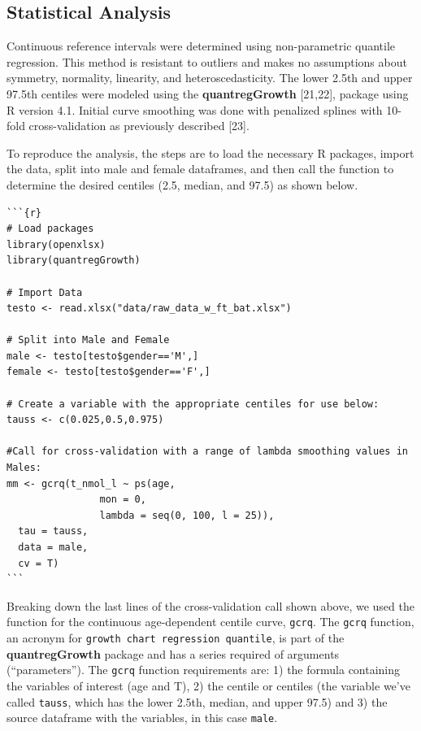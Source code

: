 \documentclass[]{elsarticle} %
\begin{document}
\hypertarget{statistical-analysis}{%
\subsection{Statistical Analysis}\label{statistical-analysis}}

Continuous reference intervals were determined using non-parametric
quantile regression. This method is resistant to outliers and makes no
assumptions about symmetry, normality, linearity, and
heteroscedasticity. The lower 2.5th and upper 97.5th centiles were
modeled using the \textbf{quantregGrowth} {[}21,22{]}, package using R
version 4.1. Initial curve smoothing was done with penalized splines
with 10-fold cross-validation as previously described {[}23{]}.

To reproduce the analysis, the steps are to load the necessary R
packages, import the data, split into male and female dataframes, and
then call the function to determine the desired centiles (2.5, median,
and 97.5) as shown below.

\begin{verbatim}
```{r}
# Load packages
library(openxlsx)
library(quantregGrowth)

# Import Data
testo <- read.xlsx("data/raw_data_w_ft_bat.xlsx")

# Split into Male and Female 
male <- testo[testo$gender=='M',]
female <- testo[testo$gender=='F',]

# Create a variable with the appropriate centiles for use below: 
tauss <- c(0.025,0.5,0.975)

#Call for cross-validation with a range of lambda smoothing values in Males:
mm <- gcrq(t_nmol_l ~ ps(age,
                mon = 0,
                lambda = seq(0, 100, l = 25)),
  tau = tauss,
  data = male,
  cv = T)
```
\end{verbatim}

Breaking down the last lines of the cross-validation call shown above,
we used the function for the continuous age-dependent centile curve,
\texttt{gcrq}. The \texttt{gcrq} function, an acronym for
\texttt{growth\ chart\ regression\ quantile}, is part of the
\textbf{quantregGrowth} package and has a series required of arguments
(``parameters''). The \texttt{gcrq} function requirements are: 1) the
formula containing the variables of interest (age and T), 2) the centile
or centiles (the variable we've called \texttt{tauss}, which has the
lower 2.5th, median, and upper 97.5) and 3) the source dataframe with
the variables, in this case \texttt{male}.
\end{document}
